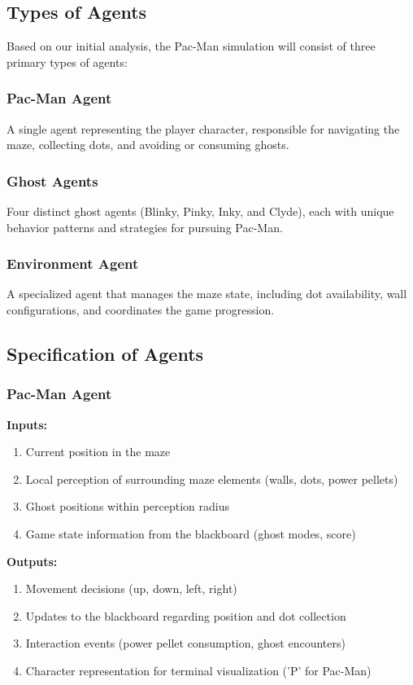 \documentclass[a4paper, 11pt]{article}
\begin{document}
\subsection{Types of Agents}

Based on our initial analysis, the Pac-Man simulation will consist of three primary types of agents:

\subsubsection{Pac-Man Agent}
A single agent representing the player character, responsible for navigating the maze, collecting dots, and avoiding or consuming ghosts.

\subsubsection{Ghost Agents}
Four distinct ghost agents (Blinky, Pinky, Inky, and Clyde), each with unique behavior patterns and strategies for pursuing Pac-Man.

\subsubsection{Environment Agent}
A specialized agent that manages the maze state, including dot availability, wall configurations, and coordinates the game progression.

\subsection{Specification of Agents}

\subsubsection{Pac-Man Agent}
\textbf{Inputs:}
\begin{enumerate}
    \item Current position in the maze
    \item Local perception of surrounding maze elements (walls, dots, power pellets)
    \item Ghost positions within perception radius
    \item Game state information from the blackboard (ghost modes, score)
\end{enumerate}

\textbf{Outputs:}
\begin{enumerate}
    \item Movement decisions (up, down, left, right)
    \item Updates to the blackboard regarding position and dot collection
    \item Interaction events (power pellet consumption, ghost encounters)
    \item Character representation for terminal visualization ('P' for Pac-Man)
\end{enumerate}
\end{document}
